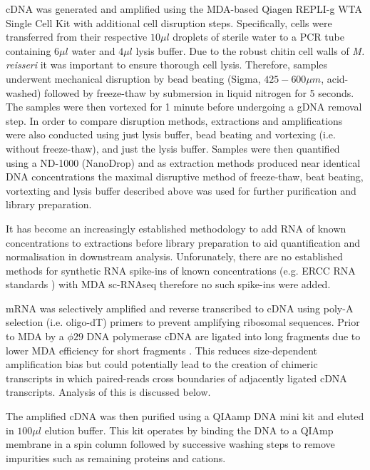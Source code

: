 cDNA was generated and amplified using the MDA-based Qiagen REPLI-g WTA Single Cell Kit \citep{Korfhage2015}
with additional cell disruption steps. 
Specifically, cells were transferred from their respective \(10\mu l\) droplets of sterile water to
a PCR tube containing \(6\mu l\) water and \(4\mu l \) lysis buffer. 
Due to the robust chitin cell walls of \textit{M. reisseri} \citep{Kapaun1995} it was important to
ensure thorough cell lysis. Therefore, samples underwent mechanical disruption by bead beating (Sigma, \(425-600\mu m\), acid-washed)
followed by freeze-thaw by submersion in liquid nitrogen for 5 seconds.  The samples were
then vortexed for 1 minute before undergoing a gDNA removal step.
In order to compare disruption methods, extractions and amplifications
were also conducted using just lysis buffer, bead beating and vortexing (i.e. without freeze-thaw), 
and just the lysis buffer.  Samples were then quantified using a ND-1000 (NanoDrop)
and as extraction methods produced near identical DNA concentrations 
the maximal disruptive method of freeze-thaw, beat beating, vortexting and lysis buffer
described above was used for further purification and library preparation.



It has become an increasingly established methodology to add RNA of known concentrations
to extractions before library preparation to aid quantification
and normalisation in downstream analysis. 
Unforunately, there are no established methods for synthetic RNA spike-ins
of known concentrations (e.g. ERCC RNA standards \citep{Jiang2011}) with MDA
sc-RNAseq therefore no such spike-ins were added.

mRNA was selectively amplified and reverse transcribed to cDNA using poly-A selection (i.e. oligo-dT) primers
to prevent amplifying ribosomal sequences. Prior to MDA by a \(\phi29\) DNA polymerase
cDNA are ligated into long fragments due to lower MDA efficiency for short fragments \citep{Korfhage2015}.
This reduces size-dependent amplification bias but could potentially lead to the creation
of chimeric transcripts in which paired-reads cross boundaries of adjacently ligated
cDNA transcripts.  Analysis of this is discussed below.

The amplified cDNA was then purified using a QIAamp DNA mini kit and eluted in \(100\mu l\) elution buffer.
This kit operates by binding the DNA to a QIAmp membrane in a spin column followed by successive washing steps
to remove impurities such as remaining proteins and cations. 




